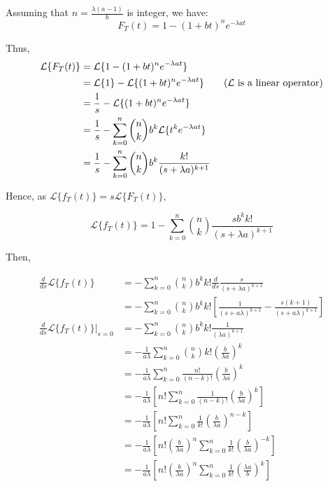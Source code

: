 Assuming that $n = \frac{\lambda(a-1)}{b}$ is integer, we have:
$$F_T(t) = 1 - (1+bt)^n e^{-\lambda at}$$

Thus,
\begin{align*}
\mathcal{L}\{F_T(t)\} &= \mathcal{L}\{1 - (1+bt)^n e^{-\lambda at}\} \\
	&= \mathcal{L}\{1\} - \mathcal{L}\{(1+bt)^n e^{-\lambda at}\} \tag{$\mathcal{L}$ is a linear operator} \\
	&= \frac{1}{s} - \mathcal{L}\{(1+bt)^n e^{-\lambda at}\} \\
	&= \frac{1}{s} - \sum_{k=0}^n \binom{n}{k} b^k \mathcal{L}\{t^k e^{-\lambda at}\} \\
	&= \frac{1}{s} - \sum_{k=0}^n \binom{n}{k} b^k \frac{k!}{(s+\lambda a)^{k+1}}
\end{align*}

Hence, as $\mathcal{L}\{f_T(t)\} = s \mathcal{L}\{F_T(t)\}$,

$$\mathcal{L}\{f_T(t)\} = 1 - \sum_{k=0}^n \binom{n}{k} \frac{s b^k k!}{(s+\lambda a)^{k+1}}$$

Then,

\begin{align*}
\frac{d}{ds} \mathcal{L}\{f_T(t)\}
	&= - \sum_{k=0}^n \binom{n}{k} b^k k! \frac{d}{ds} \frac{s}{(s+\lambda a)^{k+1}} \\
	&= - \sum_{k=0}^n \binom{n}{k} b^k k! \left[ \frac{1}{(s+a\lambda)^{k+1}} - \frac{s(k+1)}{(s+a \lambda)^{k+1}} \right] \\
\frac{d}{ds} \mathcal{L}\{f_T(t)\}|_{s=0}
	&= - \sum_{k=0}^n \binom{n}{k} b^k k! \frac{1}{(\lambda a)^{k+1}} \\
	&= - \frac{1}{a\lambda} \sum_{k=0}^n \binom{n}{k} k! \left( \frac{b}{\lambda a} \right)^k \\
	&= - \frac{1}{a\lambda} \sum_{k=0}^n \frac{n!}{(n-k)!} \left( \frac{b}{\lambda a} \right)^k \\
	&= - \frac{1}{a\lambda} \left[ n! \sum_{k=0}^n \frac{1}{(n-k)!} \left( \frac{b}{\lambda a} \right)^k \right] \\
	&= - \frac{1}{a\lambda} \left[ n! \sum_{k=0}^n \frac{1}{k!} \left( \frac{b}{\lambda a} \right)^{n-k} \right] \tag{$k \rightarrow n-k$} \\
	&= - \frac{1}{a\lambda} \left[ n! \left(\frac{b}{\lambda a}\right)^n \sum_{k=0}^n \frac{1}{k!} \left( \frac{b}{\lambda a} \right)^{-k} \right] \\
	&= - \frac{1}{a\lambda} \left[ n! \left(\frac{b}{\lambda a}\right)^n \sum_{k=0}^n \frac{1}{k!} \left( \frac{\lambda a}{b} \right)^{k} \right]
\end{align*}

